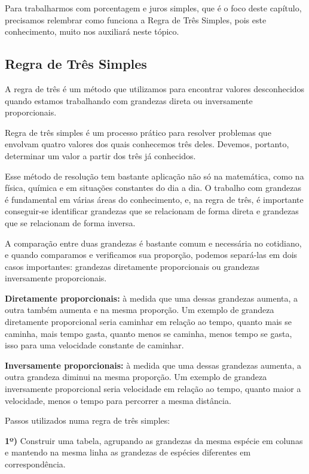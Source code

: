 \begin{multicols*}{2}
        Para trabalharmos com porcentagem e juros simples, que é o foco deste capítulo, precisamos relembrar como funciona a Regra de Três Simples, pois este conhecimento, muito nos auxiliará neste tópico.
        
        \subsection{Regra de Três Simples}
        
        A regra de três é um método que utilizamos para encontrar valores desconhecidos quando estamos trabalhando com grandezas direta ou inversamente proporcionais.
       
		Regra de três simples é um processo prático para resolver problemas que envolvam quatro valores dos quais conhecemos três deles. Devemos, portanto, determinar um valor a partir dos três já conhecidos.
		       
       Esse método de resolução tem bastante aplicação não só na matemática, como na física, química e em situações constantes do dia a dia. O trabalho com grandezas é fundamental em várias áreas do conhecimento, e, na regra de três, é importante conseguir-se identificar grandezas que se relacionam de forma direta e grandezas que se relacionam de forma inversa.
       
       A comparação entre duas grandezas é bastante comum e necessária no cotidiano, e quando comparamos e verificamos sua proporção, podemos separá-las em dois casos importantes: grandezas diretamente proporcionais ou grandezas inversamente proporcionais.

		\textbf{Diretamente proporcionais:} à medida que uma dessas grandezas aumenta, a outra também aumenta e na mesma proporção. Um exemplo de grandeza diretamente proporcional seria caminhar em relação ao tempo, quanto mais se caminha, mais tempo gasta, quanto menos se caminha, menos tempo se gasta, isso para uma velocidade constante de caminhar.
		
		\textbf{Inversamente proporcionais:} à medida que uma dessas grandezas aumenta, a outra grandeza diminui na mesma proporção. Um exemplo de grandeza inversamente proporcional seria velocidade em relação ao tempo, quanto maior a velocidade, menos o tempo para percorrer a mesma distância.
		
		Passos utilizados numa regra de três simples:
		
\textbf{1º)} Construir uma tabela, agrupando as grandezas da mesma espécie em colunas e mantendo na mesma linha as grandezas de espécies diferentes em correspondência.


\end{multicols*}
